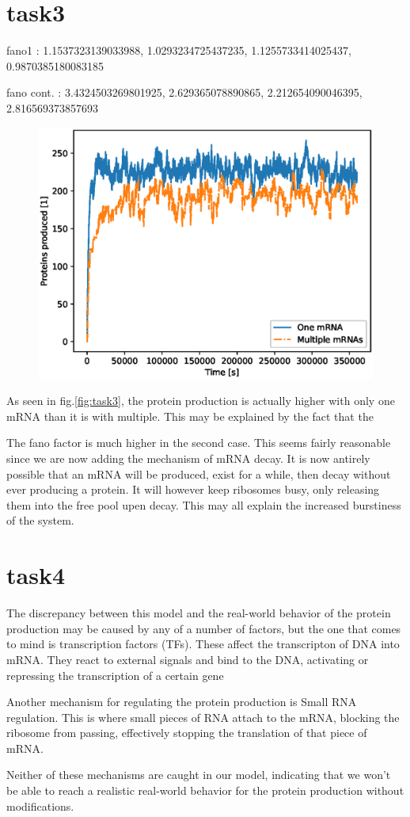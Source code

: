 \documentclass{article}
\begin{document}
\section{task3}
fano1 : 1.1537323139033988,  1.0293234725437235, 1.1255733414025437,  0.9870385180083185


fano cont. : 3.4324503269801925, 2.629365078890865, 2.212654090046395, 2.816569373857693

\begin{figure}[H]
	\includegraphics[width=\linewidth]{figs/task3_prot_prod_both_graphs_v1.eps}
	\label{fig:task3}
\end{figure}

As seen in fig.\eqref{fig:task3}, the protein production is actually higher with only one mRNA than it is with multiple. This may be explained by the fact that the 

The fano factor is much higher in the second case. This seems fairly reasonable since we are now adding the mechanism of mRNA decay. It is now antirely possible that an mRNA will be produced, exist for a while, then decay without ever producing a protein. It will however keep ribosomes busy, only releasing them into the free pool upen decay. This may all explain the increased burstiness of the system. 





\section{task4}
The discrepancy between this model and the real-world behavior of the protein production may be caused by any of a number of factors, but the one that comes to mind is transcription factors (TFs). These affect the transcripton of DNA into mRNA. They react to external signals and bind to the DNA, activating or repressing the transcription of a certain gene

Another mechanism for regulating the protein production is Small RNA regulation. This is where small pieces of RNA attach to the mRNA, blocking the ribosome from passing, effectively stopping the translation of that piece of mRNA. 

Neither of these mechanisms are caught in our model, indicating that we won't be able to reach a realistic real-world behavior for the protein production without modifications. 
\end{document}
